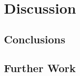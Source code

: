 \chapter{Discussion}
\label{chap:discussion}


\section{Conclusions}

\section{Further Work}








